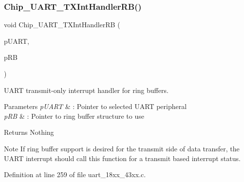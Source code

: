 \mbox{\label{group___u_a_r_t__18_x_x__43_x_x_ga74df5e39960a1535118fcfe2fbe90d30}} 
\subsubsection{\texorpdfstring{Chip\+\_\+\+U\+A\+R\+T\+\_\+\+T\+X\+Int\+Handler\+R\+B()}{Chip\_UART\_TXIntHandlerRB()}}
{\footnotesize\ttfamily void Chip\+\_\+\+U\+A\+R\+T\+\_\+\+T\+X\+Int\+Handler\+RB (\begin{DoxyParamCaption}\item[{\hyperlink{struct_l_p_c___u_s_a_r_t___t}{L\+P\+C\+\_\+\+U\+S\+A\+R\+T\+\_\+T} $\ast$}]{p\+U\+A\+RT,  }\item[{\hyperlink{struct_r_i_n_g_b_u_f_f___t}{R\+I\+N\+G\+B\+U\+F\+F\+\_\+T} $\ast$}]{p\+RB }\end{DoxyParamCaption})}



U\+A\+RT transmit-\/only interrupt handler for ring buffers. 


\begin{DoxyParams}{Parameters}
{\em p\+U\+A\+RT} & \+: Pointer to selected U\+A\+RT peripheral \\
\hline
{\em p\+RB} & \+: Pointer to ring buffer structure to use \\
\hline
\end{DoxyParams}
\begin{DoxyReturn}{Returns}
Nothing 
\end{DoxyReturn}
\begin{DoxyNote}{Note}
If ring buffer support is desired for the transmit side of data transfer, the U\+A\+RT interrupt should call this function for a transmit based interrupt status. 
\end{DoxyNote}


Definition at line 259 of file uart\+\_\+18xx\+\_\+43xx.\+c.

